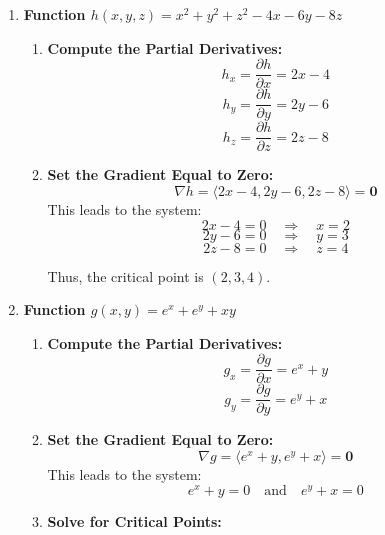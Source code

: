 \begin{example}
\begin{solution}
\begin{enumerate}
\begin{enumerate}
            Thus, the only critical point is \( (0, 0) \).
        \end{enumerate}
        
        \item \textbf{Function \( h(x,y,z) = x^2 + y^2 + z^2 - 4x - 6y - 8z \)}
        
        \begin{enumerate}
            \item \textbf{Compute the Partial Derivatives:}
            \[
            h_x = \frac{\partial h}{\partial x} = 2x - 4
            \]
            \[
            h_y = \frac{\partial h}{\partial y} = 2y - 6
            \]
            \[
            h_z = \frac{\partial h}{\partial z} = 2z - 8
            \]
            
            \item \textbf{Set the Gradient Equal to Zero:}
            \[
            \nabla h = \langle 2x - 4, 2y - 6, 2z - 8 \rangle = \mathbf{0}
            \]
            This leads to the system:
            \[
            2x - 4 = 0 \quad \Rightarrow \quad x = 2
            \]
            \[
            2y - 6 = 0 \quad \Rightarrow \quad y = 3
            \]
            \[
            2z - 8 = 0 \quad \Rightarrow \quad z = 4
            \]
            
            Thus, the critical point is \( (2, 3, 4) \).
        \end{enumerate}
        
        \item \textbf{Function \( g(x,y) = e^{x} + e^{y} + xy \)}
        
        \begin{enumerate}
            \item \textbf{Compute the Partial Derivatives:}
            \[
            g_x = \frac{\partial g}{\partial x} = e^{x} + y
            \]
            \[
            g_y = \frac{\partial g}{\partial y} = e^{y} + x
            \]
            
            \item \textbf{Set the Gradient Equal to Zero:}
            \[
            \nabla g = \langle e^{x} + y, e^{y} + x \rangle = \mathbf{0}
            \]
            This leads to the system:
            \[
            e^{x} + y = 0 \quad \text{and} \quad e^{y} + x = 0
            \]
            
            \item \textbf{Solve for Critical Points:}
            

\end{enumerate}
\end{enumerate}
\end{solution}
\end{example}

